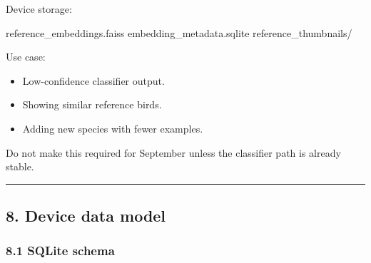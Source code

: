 \documentclass[
  11pt,
]{article}
\newenvironment{Shaded}{}{}
\newcommand{\NormalTok}[1]{#1}
\providecommand{\tightlist}{%
  \setlength{\itemsep}{0pt}\setlength{\parskip}{0pt}}
\begin{document}
Device storage:

\begin{Shaded}
\begin{Highlighting}[]
\NormalTok{reference\_embeddings.faiss}
\NormalTok{embedding\_metadata.sqlite}
\NormalTok{reference\_thumbnails/}
\end{Highlighting}
\end{Shaded}

Use case:

\begin{itemize}
\tightlist
\item
  Low-confidence classifier output.
\item
  Showing similar reference birds.
\item
  Adding new species with fewer examples.
\end{itemize}

Do not make this required for September unless the classifier path is
already stable.

\begin{center}\rule{0.5\linewidth}{0.5pt}\end{center}

\subsection{8. Device data model}\label{device-data-model}

\subsubsection{8.1 SQLite schema}\label{sqlite-schema}
\end{document}
